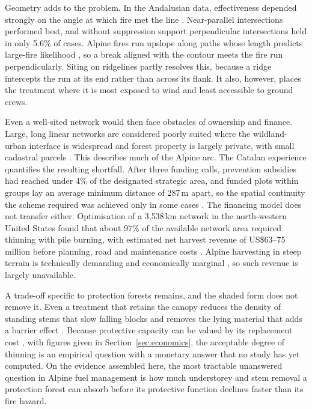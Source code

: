 \documentclass[11pt,a4paper]{article}
\begin{document}
Geometry adds to the problem. In the Andalusian data, effectiveness depended strongly on the angle at which fire met the line \citep{ortega_modeling_2024}. Near-parallel intersections performed best, and without suppression support perpendicular intersections held in only 5.6\% of cases. Alpine fires run upslope along paths whose length predicts large-fire likelihood \citep{conedera_linking_2024}, so a break aligned with the contour meets the fire run perpendicularly. Siting on ridgelines \citep{ascoli_firebreak_2018} partly resolves this, because a ridge intercepts the run at its end rather than across its flank. It also, however, places the treatment where it is most exposed to wind and least accessible to ground crews.

Even a well-sited network would then face obstacles of ownership and finance. Large, long linear networks are considered poorly suited where the wildland-urban interface is widespread and forest property is largely private, with small cadastral parcels \citep{ascoli_firebreak_2018}. This describes much of the Alpine arc. The Catalan experience quantifies the resulting shortfall. After three funding calls, prevention subsidies had reached under 4\% of the designated strategic area, and funded plots within groups lay an average minimum distance of 287\,m apart, so the spatial continuity the scheme required was achieved only in some cases \citep{gorrizmifsud_current_2026}. The financing model does not transfer either. Optimisation of a 3{,}538\,km network in the north-western United States found that about 97\% of the available network area required thinning with pile burning, with estimated net harvest revenue of US\$63--75 million before planning, road and maintenance costs \citep{ager_optimizing_2023}. Alpine harvesting in steep terrain is technically demanding and economically marginal \citep{dinca_timber_2025}, so such revenue is largely unavailable.

A trade-off specific to protection forests remains, and the shaded form does not remove it. Even a treatment that retains the canopy reduces the density of standing stems that slow falling blocks \citep{moos_climate_2021} and removes the lying material that adds a barrier effect \citep{costa_biological_2021}. Because protective capacity can be valued by its replacement cost \citep{accastello_asforesee_2019}, with figures given in Section~\ref{sec:economics}, the acceptable degree of thinning is an empirical question with a monetary answer that no study has yet computed. On the evidence assembled here, the most tractable unanswered question in Alpine fuel management is how much understorey and stem removal a protection forest can absorb before its protective function declines faster than its fire hazard.
\end{document}
